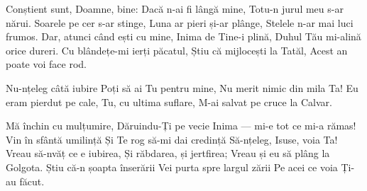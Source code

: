 \beginverse
Conștient sunt, Doamne, bine:
Dacă n-ai fi lângă mine,
Totu-n jurul meu s-ar nărui.
Soarele pe cer s-ar stinge,
Luna ar pieri și-ar plânge,
Stelele n-ar mai luci frumos.
Dar, atunci când ești cu mine,
Inima de Tine-i plină,
Duhul Tău mi-alină orice dureri.
Cu blândețe-mi ierți păcatul,
Știu că mijlocești la Tatăl,
Acest an poate voi face rod.
\endverse

\beginchorus
Nu-nțeleg câtă iubire
Poți să ai Tu pentru mine,
Nu merit nimic din mila Ta!
Eu eram pierdut pe cale,
Tu, cu ultima suflare,
M-ai salvat pe cruce la Calvar.
\endchorus

\beginverse
Mă închin cu mulțumire,
Dăruindu-Ți pe vecie
Inima — mi-e tot ce mi-a rămas!
Vin în sfântă umilință
Și Te rog să-mi dai credință
Să-nțeleg, Isuse, voia Ta!
Vreau să-nvăț ce e iubirea,
Și răbdarea, și jertfirea;
Vreau și eu să plâng la Golgota.
Știu că-n șoapta înserării
Vei purta spre largul zării
Pe acei ce voia Ți-au făcut.
\endverse
\endsong